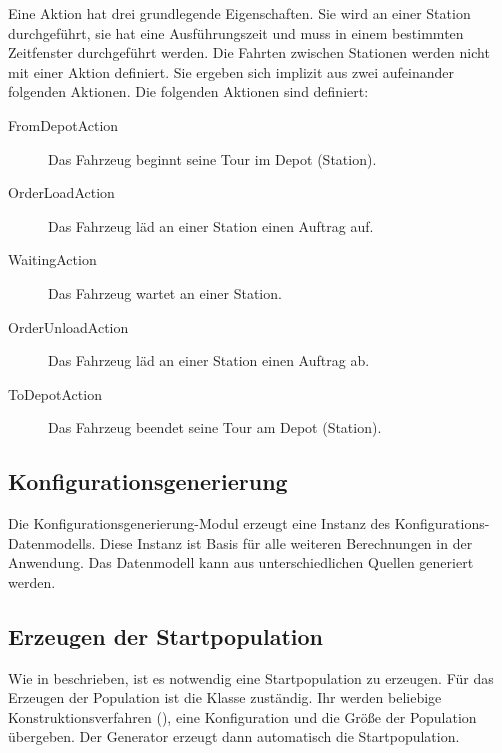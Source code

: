 Eine Aktion hat drei grundlegende Eigenschaften. Sie wird an einer Station durchgeführt, sie hat eine Ausführungszeit und muss in einem bestimmten Zeitfenster durchgeführt werden. Die Fahrten zwischen Stationen werden nicht mit einer Aktion definiert. Sie ergeben sich implizit aus zwei aufeinander folgenden Aktionen. Die folgenden Aktionen sind definiert:
\begin{description}
 \item[FromDepotAction] Das Fahrzeug beginnt seine Tour im Depot (Station). 
 \item[OrderLoadAction] Das Fahrzeug läd an einer Station einen Auftrag auf.
 \item[WaitingAction] Das Fahrzeug wartet an einer Station.
 \item[OrderUnloadAction] Das Fahrzeug läd an einer Station einen Auftrag ab.
 \item[ToDepotAction] Das Fahrzeug beendet seine Tour am Depot (Station).
\end{description}


\FloatBarrier
\subsection{Konfigurationsgenerierung}
Die Konfigurationsgenerierung-Modul erzeugt eine Instanz des Konfigurations-Datenmodells. Diese Instanz ist Basis für alle weiteren Berechnungen in der Anwendung. Das Datenmodell kann aus unterschiedlichen Quellen generiert werden. 

\subsection{Erzeugen der Startpopulation}
Wie in  beschrieben, ist es notwendig eine Startpopulation zu erzeugen. Für das Erzeugen der Population ist die Klasse  zuständig. Ihr werden beliebige Konstruktionsverfahren (), eine Konfiguration und die Größe der Population übergeben. Der Generator erzeugt dann automatisch die Startpopulation.


